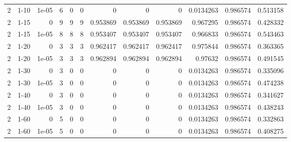 \begin{tabular}{rlrrrrrrrrrr}
     2 & 1-10   &      1e-05 &           6 &                 0 &                 0 &     0           &     0           &      0           &        0.0134263 &               0.986574 &           0.513158 \\
     2 & 1-15   &      0     &           9 &                 9 &                 9 &     0.953869    &     0.953869    &      0.953869    &        0.967295  &               0.986574 &           0.428332 \\
     2 & 1-15   &      1e-05 &           8 &                 8 &                 8 &     0.953407    &     0.953407    &      0.953407    &        0.966833  &               0.986574 &           0.543463 \\
     2 & 1-20   &      0     &           3 &                 3 &                 3 &     0.962417    &     0.962417    &      0.962417    &        0.975844  &               0.986574 &           0.363365 \\
     2 & 1-20   &      1e-05 &           3 &                 3 &                 3 &     0.962894    &     0.962894    &      0.962894    &        0.97632   &               0.986574 &           0.491545 \\
     2 & 1-30   &      0     &           3 &                 0 &                 0 &     0           &     0           &      0           &        0.0134263 &               0.986574 &           0.335096 \\
     2 & 1-30   &      1e-05 &           3 &                 0 &                 0 &     0           &     0           &      0           &        0.0134263 &               0.986574 &           0.474238 \\
     2 & 1-40   &      0     &           3 &                 0 &                 0 &     0           &     0           &      0           &        0.0134263 &               0.986574 &           0.341627 \\
     2 & 1-40   &      1e-05 &           3 &                 0 &                 0 &     0           &     0           &      0           &        0.0134263 &               0.986574 &           0.438243 \\
     2 & 1-60   &      0     &           5 &                 0 &                 0 &     0           &     0           &      0           &        0.0134263 &               0.986574 &           0.332863 \\
     2 & 1-60   &      1e-05 &           5 &                 0 &                 0 &     0           &     0           &      0           &        0.0134263 &               0.986574 &           0.408275 \\

\end{tabular}
